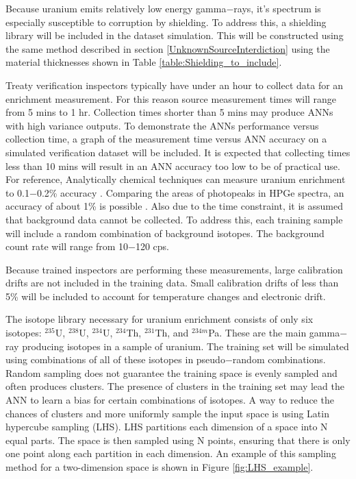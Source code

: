 \documentclass[tocnosub,noragright,centerchapter,12pt,fullpage]{uiucecethesis09}
\begin{document}
Because uranium emits relatively low energy gamma$-$rays, it's spectrum is especially susceptible to corruption by shielding. To address this, a shielding library will be included in the dataset simulation. This will be constructed using the same method described in section \ref{UnknownSourceInterdiction} using the material thicknesses shown in Table \ref{table:Shielding_to_include}.

Treaty verification inspectors typically have under an hour to collect data for an enrichment measurement. For this reason source measurement times will range from 5 mins to 1 hr. Collection times shorter than 5 mins may produce ANNs with high variance outputs. To demonstrate the ANNs performance versus collection time, a graph of the measurement time versus ANN accuracy on a simulated verification dataset will be included. It is expected that collecting times less than 10 mins will result in an ANN accuracy too low to be of practical use. For reference, Analytically chemical techniques can measure uranium enrichment to 0.1$-$0.2\% accuracy \cite{Pandas_Ch7_1991}. Comparing the areas of photopeaks in HPGe spectra, an accuracy of about 1\% is possible \cite{Pandas_Ch7_1991}. Also due to the time constraint, it is assumed that background data cannot be collected. To address this, each training sample will include a random combination of background isotopes. The background count rate will range from 10$-$120 cps.


Because trained inspectors are performing these measurements, large calibration drifts are not included in the training data. Small calibration drifts of less than 5\% will be included to account for temperature changes and electronic drift.

The isotope library necessary for uranium enrichment consists of only six isotopes: $^{235}$U, $^{238}$U, $^{234}$U, $^{234}$Th, $^{231}$Th, and $^{234m}$Pa. These are the main gamma$-$ray producing isotopes in a sample of uranium. The training set will be simulated using combinations of all of these isotopes in pseudo$-$random combinations. Random sampling does not guarantee the training space is evenly sampled and often produces clusters. The presence of clusters in the training set may lead the ANN to learn a bias for certain combinations of isotopes. A way to reduce the chances of clusters and more uniformly sample the input space is using Latin hypercube sampling (LHS). LHS partitions each dimension of a space into N equal parts. The space is then sampled using N points, ensuring that there is only one point along each partition in each dimension. An example of this sampling method for a two-dimension space is shown in Figure \ref{fig:LHS_example}.
\end{document}
